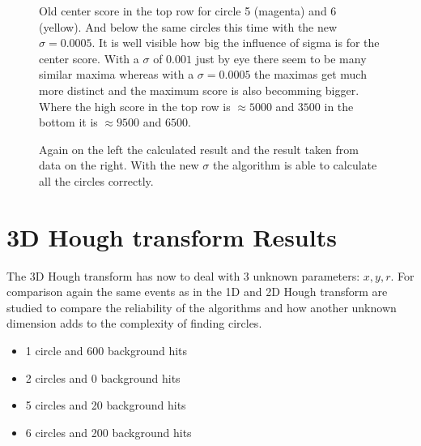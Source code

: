 \documentclass[11pt,twoside]{scrreprt}
\begin{document}
\begin{figure}
\centering
 
  \caption[2D HT: Comparison center scores 6 circles, 200 background hits]{Old center score in the top row for circle 5 (magenta) and 6 (yellow). And below the same circles this time with the new $\sigma=0.0005$. It is well visible how big the influence of sigma is for the center score. With a $\sigma$ of $0.001$ just by eye there seem to be many similar maxima whereas with a $\sigma=0.0005$ the maximas get much more distinct and the maximum score is also becomming bigger. Where the high score in the top row is $\approx 5000$ and $3500$ in the bottom it is $\approx 9500$ and $6500$.}
\end{figure}


\begin{figure}
\centering
\caption[2D HT: Comparison result, 6 circles, 200 background hits]{Again on the left the calculated result and the result taken from data on the right. With the new $\sigma$ the algorithm is able to calculate all the circles correctly.}\label{2d_result_6c_200bg_corr}
\end{figure}

\clearpage
\section{3D Hough transform Results} %
\label{sec:3d_hough_transform_results}
The 3D Hough transform has now to deal with 3 unknown parameters: $x,y,r$. For comparison again the same events
as in the 1D and 2D Hough transform are studied to compare the reliability of the algorithms and how another
unknown dimension adds to the complexity of finding circles.

\begin{itemize}
  \item 1 circle and 600 background hits
  \item 2 circles and 0 background hits
  \item 5 circles and 20 background hits
  \item 6 circles and 200 background hits
\end{itemize}
\end{document}
